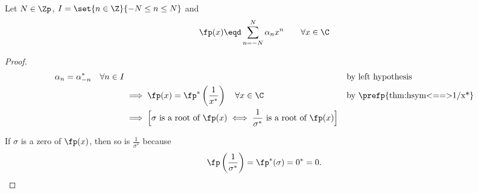 \begin{theorem}
\label{thm:hsym==>rconj}
Let $N\in\Zp$, $I=\set{n\in\Z}{-N\le n\le N}$ and 
  \[ \fp(x) \eqd \sum_{n=-N}^N \alpha_n x^n  \qquad \forall x\in\C \]
\end{theorem}
\begin{proof}
\begin{align*}
  \alpha_n = \alpha_{-n}^\ast \quad \forall n\in I
    &&& \text{by left hypothesis}
  \\&\implies \fp(x) = \fp^\ast\left(\frac{1}{x^\ast}\right)  \quad \forall x\in\C
    && \text{by \prefp{thm:hsym<==>1/x*}}
  \\&\implies 
    \Big[
    \sigma \text{ is a root of }\fp(x) 
    \iff
    \frac{1}{\sigma^\ast} \text{ is a root of }\fp(x)
    \Big]
\end{align*}

If $\sigma$ is a zero of $\fp(x)$, 
then so is $\frac{1}{\sigma^\ast}$ because
\[ \fp\left(\frac{1}{\sigma^\ast}\right) = \fp^\ast(\sigma) = 0^\ast = 0.\]
\end{proof}




